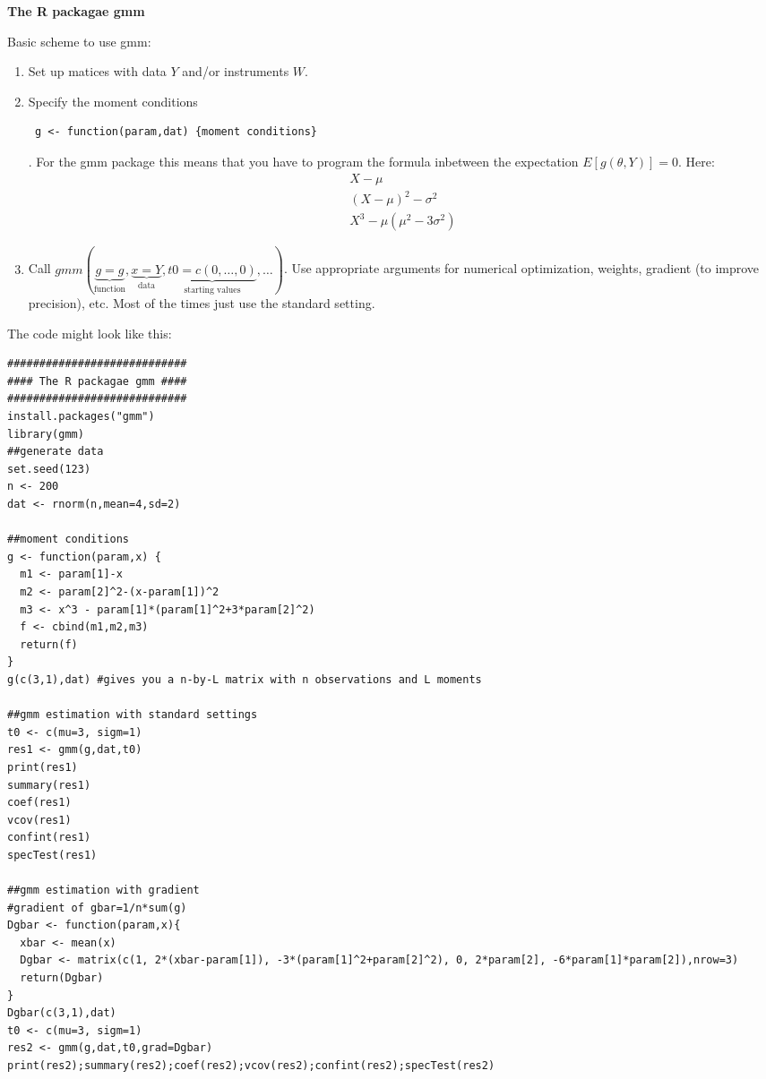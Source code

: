 \begin{Solution}{14.1}
\textbf{The R packagae gmm}

Basic scheme to use gmm:
\begin{enumerate}
  \item Set up matices with data $Y$ and/or instruments $W$.
  \item Specify the moment conditions
  \begin{verbatim} g <- function(param,dat) {moment conditions} \end{verbatim}.
  For the gmm package this means that you have to program the formula
      inbetween the expectation $E[g(\theta,Y)]=0$. Here: \begin{align*}
      X-\mu\\
      (X-\mu)^2 - \sigma^2\\
      X^3-\mu(\mu^2-3\sigma^2)
      \end{align*}
  \item Call
      $gmm(\underbrace{g=g}_\text{function},\underbrace{x=Y}_\text{data},\underbrace{t0=c(0,\dots,0)}_{\text{starting
      values}},\dots)$. Use appropriate arguments for numerical
      optimization, weights, gradient (to improve precision), etc. Most
      of the times just use the standard setting.
\end{enumerate}

The code might look like this:
\begin{verbatim}
############################
#### The R packagae gmm ####
############################
install.packages("gmm")
library(gmm)
##generate data
set.seed(123)
n <- 200
dat <- rnorm(n,mean=4,sd=2)

##moment conditions
g <- function(param,x) {
  m1 <- param[1]-x
  m2 <- param[2]^2-(x-param[1])^2
  m3 <- x^3 - param[1]*(param[1]^2+3*param[2]^2)
  f <- cbind(m1,m2,m3)
  return(f)
}
g(c(3,1),dat) #gives you a n-by-L matrix with n observations and L moments

##gmm estimation with standard settings
t0 <- c(mu=3, sigm=1)
res1 <- gmm(g,dat,t0)
print(res1)
summary(res1)
coef(res1)
vcov(res1)
confint(res1)
specTest(res1)

##gmm estimation with gradient
#gradient of gbar=1/n*sum(g)
Dgbar <- function(param,x){
  xbar <- mean(x)
  Dgbar <- matrix(c(1, 2*(xbar-param[1]), -3*(param[1]^2+param[2]^2), 0, 2*param[2], -6*param[1]*param[2]),nrow=3)
  return(Dgbar)
}
Dgbar(c(3,1),dat)
t0 <- c(mu=3, sigm=1)
res2 <- gmm(g,dat,t0,grad=Dgbar)
print(res2);summary(res2);coef(res2);vcov(res2);confint(res2);specTest(res2)


\end{verbatim}
\end{Solution}
